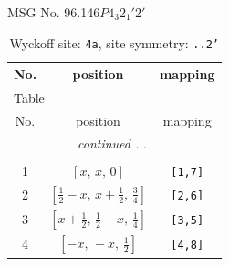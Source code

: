 \documentclass[fleqn,8pt]{jsarticle}
\begin{document}
\setcounter{MaxMatrixCols}{32}

\renewcommand{\tablename}{Table~}
\renewcommand{\figurename}{Figure~}
\begin{center}
\LARGE
MSG No. 96.146\quad$P4_{3}2_{1}'2'$
\end{center}
\renewcommand{\arraystretch}{1.2}
\begin{longtable}{ccc}
\caption{Wyckoff site: {\tt 4a}, site symmetry: {\tt ..2'}}
 \\
 \hline \hline
No. & position & mapping \\ \hline \endfirsthead

\multicolumn{2}{l}{\tablename\ \thetable{}} \\
 \hline \hline
No. & position & mapping \\ \hline \endhead

 \hline \hline
\multicolumn{2}{r}{\footnotesize\it continued ...} \\ \endfoot

 \hline \hline
\multicolumn{2}{r}{} \\ \endlastfoot

1 & $\left[ x,\, x,\, 0 \right]$ & {\tt [1,7]} \\ \hline
2 & $\left[ \frac{1}{2} - x,\, x + \frac{1}{2},\, \frac{3}{4} \right]$ & {\tt [2,6]} \\ \hline
3 & $\left[ x + \frac{1}{2},\, \frac{1}{2} - x,\, \frac{1}{4} \right]$ & {\tt [3,5]} \\ \hline
4 & $\left[ - x,\, - x,\, \frac{1}{2} \right]$ & {\tt [4,8]} \\
\end{longtable}
\renewcommand{\arraystretch}{1.2}
\end{document}
